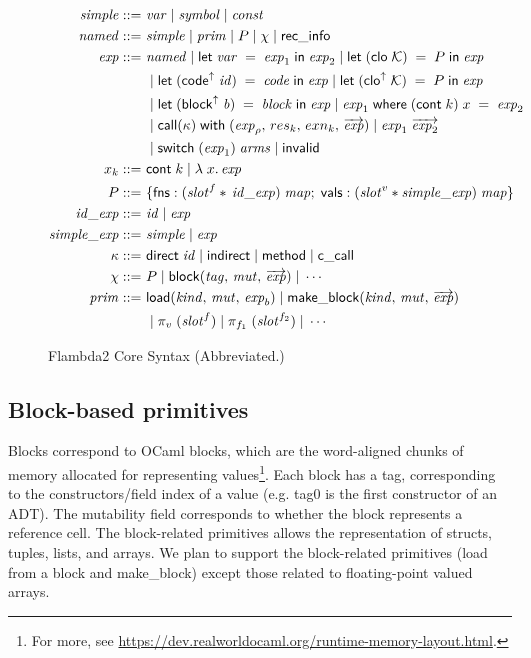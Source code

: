\documentclass[11pt,fleqn]{amsart}
\begin{document}
\newcommand{\eval}[2]{\langle #1, \, #2\rangle}
\newcommand{\rebind}[3]{#1 \; [ #2 \mapsto #3 ]}

\begin{figure}[ht]
  \footnotesize
  \begin{align*}
    \mathit{simple} ::=~& \mathit{var} \; | \; \mathit{symbol} \; | \; \mathit{const} \\
    \mathit{named} ::=~& \mathit{simple} \; | \; \mathit{prim} \; | \; P \; | \; \chi \; | \; \mathsf{rec\_info} \\
    \mathit{exp} ::=~& \mathit{named} \; | \; \mathsf{let}\; \mathit{var} \; = \; \mathit{exp}_1 \; \mathsf{in} \; \mathit{exp}_2 \; | \; \mathsf{let}\; (\mathsf{clo} \; \mathcal{K}) \; = \; P \; \mathsf{in} \; \mathit{exp}\\
    & \; | \; \mathsf{let}\; (\mathsf{code}^{\uparrow} \; \mathit{id}) \; = \; \mathit{code} \; \mathsf{in} \; \mathit{exp} \; | \; \mathsf{let}\; (\mathsf{clo}^{\uparrow} \; \mathcal{K}) \; = \; P \; \mathsf{in} \; \mathit{exp} \\
    & \; | \; \mathsf{let}\; (\mathsf{block}^{\uparrow} \; \mathit{b}) \; = \; \mathit{block} \; \mathsf{in} \; \mathit{exp} \; | \; \mathit{exp}_1 \; \mathsf{where} \; (\mathsf{cont}\; k) \; x \; = \; \mathit{exp}_2 \\
    & \; | \; \mathsf{call}(\kappa) \; \mathsf{with} \; (\mathit{exp}_{\rho}, \, res_k, \, exn_k, \, \overrightarrow{\mathit{exp}}) \; | \; \mathit{exp}_1 \; \overrightarrow{\mathit{exp}_2} \\
    & \; | \; \mathsf{switch}\; (\mathit{exp}_1) \; \mathit{arms} \; | \; \mathsf{invalid} \\
    x_k ::=~& \mathsf{cont}\; k \; | \; \lambda \; x.\, \mathit{exp} \\
    P ::=~& \{ \mathsf{fns} : (\mathit{slot}^{f} \ast \, \mathit{id\_exp} ) \; \mathit{map} ; \;
    \mathsf{vals} : (\mathit{slot}^{v} \ast \mathit{simple\_exp}) \; \mathit{map} \}\\
    \mathit{id\_exp} ::=~& \mathit{id} \; | \; \mathit{exp} \\
    \mathit{simple\_exp} ::=~& \mathit{simple} \; | \; \mathit{exp} \\
    \kappa ::=~& \mathsf{direct} \; \mathit{id} \; | \; \mathsf{indirect} \; | \; \mathsf{method} \; | \; \mathsf{c\_call} \\
    \chi ::=~& P \; | \; \mathsf{block}(\mathit{tag},\,\mathit{mut},\,\overrightarrow{\mathit{exp}}) \; | \; \cdots \\
    \mathit{prim} ::=~& \mathsf{load}(\mathit{kind},\,\mathit{mut},\,\mathit{exp}_b) \; | \; \mathsf{make\_block}(\mathit{kind},\,\mathit{mut},\,\overrightarrow{\mathit{exp}}) \\
    & \; | \; \pi_{v} \; (\mathit{slot}^{f}) \; | \; \pi_{f_1} \; (\mathit{slot}^{f_2}) \; | \; \cdots
  \end{align*}
  \caption{Flambda2 Core Syntax (Abbreviated.) }
  \label{fig:syntax}
\end{figure}

\subsection{Block-based primitives}
Blocks correspond to OCaml blocks, which are the word-aligned chunks of memory allocated for representing values\footnote{For more, see \url{https://dev.realworldocaml.org/runtime-memory-layout.html}. }.
Each block has a tag, corresponding to the constructors/field index of a value (e.g. \textsf{tag0} is the first constructor of an ADT).
The mutability field corresponds to whether the block represents a reference cell.
The block-related primitives allows the representation of structs, tuples, lists, and arrays.
We plan to support the block-related primitives (\textsf{load} from a block and \textsf{make\_block}) except those related to floating-point valued arrays.
\end{document}
